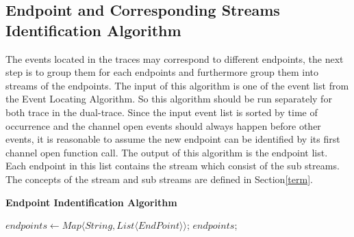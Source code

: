 \subsection{Endpoint and Corresponding Streams Identification Algorithm}
The events located in the traces may correspond to different endpoints, the next step is to group them for each endpoints and furthermore group them into streams of the endpoints. The input of this algorithm is one of the event list from the Event Locating Algorithm. So this algorithm should be run separately for both trace in the dual-trace. Since the input event list is sorted by time of occurrence and the channel open events should always happen before other events, it is reasonable to assume the new endpoint can be identified by its first channel open function call. The output of this algorithm is the endpoint list. Each endpoint in this list contains the stream which consist of the sub streams. The concepts of the stream and sub streams are defined in Section\ref{term}. 

\begin{algorithm}[H]
\DontPrintSemicolon
\caption{{\bf Endpoint Indentification Algorithm} \label{endpointIdentAlg}}
$endpoints \leftarrow Map \langle String, List \langle EndPoint\rangle \rangle$;\; 
\KwRet $endpoints$;\;
\end{algorithm} 

